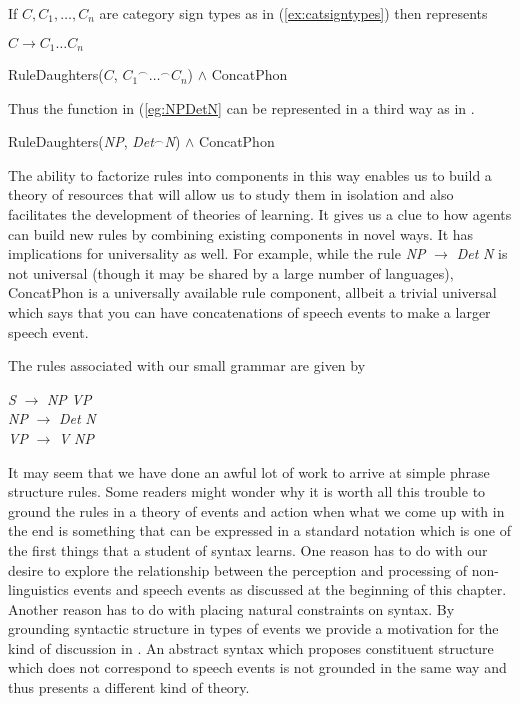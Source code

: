 If $C,C_1,\ldots,C_n$ are category sign types
as in (\ref{ex:catsigntypes}) then  represents 
\begin{ex} 
\begin{subex} 
 
\item $C \longrightarrow C_1 \ldots C_n$ 
 
\item RuleDaughters($C$,
${C_1}^{\frown}\ldots^{\frown}C_n$) \d{\d{$\wedge$}} ConcatPhon 
 
\end{subex} 
   
\end{ex} 
Thus the function in (\ref{eg:NPDetN} can be
represented in a third way as in \nexteg{}.
\begin{ex} 
RuleDaughters(\textit{NP}, \textit{Det}$^{\frown}$\textit{N})
\d{\d{$\wedge$}} ConcatPhon 
\end{ex} 
The ability to factorize rules into 
components in this way enables us to build a theory of resources
that will allow us to study them in isolation and also facilitates
the development of theories of learning.  It gives us a clue to how agents can build new
rules by combining existing components in novel ways.  It has implications for universality
as well. For example, while the rule
\textit{NP} $\longrightarrow$ \textit{Det} \textit{N} is not universal
(though it may be shared by a large number of languages), ConcatPhon
is a universally available rule component, allbeit a trivial universal
which says that you can have concatenations of speech events to make a
larger speech event.    
     

The rules associated with our small grammar are given by \nexteg{}
\begin{ex} 
\textit{S} $\longrightarrow$ \textit{NP} \textit{VP} \\
\textit{NP} $\longrightarrow$ \textit{Det} \textit{N} \\
\textit{VP} $\longrightarrow$ \textit{V} \textit{NP} 
\end{ex} 
  
It may seem that we have done an awful lot of work to arrive at simple
phrase structure rules.  Some readers might wonder why it is worth all
this trouble to ground the rules in a theory of events and action when
what we come up with in the end is something that can be expressed in
a standard notation which is one of the first things that a student of
syntax learns.  One reason has to do with our desire to explore the
relationship between the perception and processing of non-linguistics
events and speech events as discussed at the beginning of this
chapter.  Another reason has to do with placing natural constraints on
syntax.  By grounding syntactic structure in types of events we
provide a motivation for the kind of discussion in
\cite{Cooper1982}.  An abstract
syntax which proposes constituent structure which does not correspond
to speech events is not grounded in the same way and thus presents a
different kind of theory.

